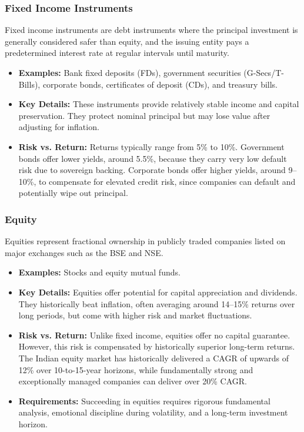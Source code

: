 \documentclass[12pt,openany]{book}
\begin{document}
\subsubsection{Fixed Income Instruments}
Fixed income instruments are debt instruments where the principal investment is generally considered safer than equity, and the issuing entity pays a predetermined interest rate at regular intervals until maturity.

\begin{itemize}[leftmargin=*]
    \item \textbf{Examples:} Bank fixed deposits (FDs), government securities (G-Secs/T-Bills), corporate bonds, certificates of deposit (CDs), and treasury bills.
    \item \textbf{Key Details:} These instruments provide relatively stable income and capital preservation. They protect nominal principal but may lose value after adjusting for inflation.
    \item \textbf{Risk vs. Return:} Returns typically range from 5\% to 10\%. Government bonds offer lower yields, around 5.5\%, because they carry very low default risk due to sovereign backing. Corporate bonds offer higher yields, around 9--10\%, to compensate for elevated credit risk, since companies can default and potentially wipe out principal.
\end{itemize}

\subsubsection{Equity}
Equities represent fractional ownership in publicly traded companies listed on major exchanges such as the BSE and NSE.

\begin{itemize}[leftmargin=*]
    \item \textbf{Examples:} Stocks and equity mutual funds.
    \item \textbf{Key Details:} Equities offer potential for capital appreciation and dividends. They historically beat inflation, often averaging around 14--15\% returns over long periods, but come with higher risk and market fluctuations.
    \item \textbf{Risk vs. Return:} Unlike fixed income, equities offer no capital guarantee. However, this risk is compensated by historically superior long-term returns. The Indian equity market has historically delivered a CAGR of upwards of 12\% over 10-to-15-year horizons, while fundamentally strong and exceptionally managed companies can deliver over 20\% CAGR.
    \item \textbf{Requirements:} Succeeding in equities requires rigorous fundamental analysis, emotional discipline during volatility, and a long-term investment horizon.
\end{itemize}
\end{document}
